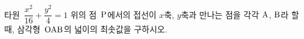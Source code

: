 타원~$\dfrac{x^2}{16}+\dfrac{y^2}{4}=1$ 위의 점~$\mathrm{P}$에서의 접선이 $x$축, $y$축과 만나는 점을 각각 $\mathrm{A}$, $\mathrm{B}$라 할 때, 삼각형~$\mathrm{OAB}$의 넓이의 최솟값을 구하시오. 
